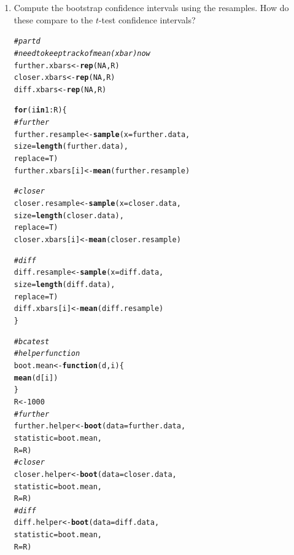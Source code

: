 \documentclass{article}\usepackage[]{graphicx}\usepackage[]{xcolor}
\makeatletter
\newcommand{\hlnum}[1]{\textcolor[rgb]{0.686,0.059,0.569}{#1}}%
\newcommand{\hlcom}[1]{\textcolor[rgb]{0.678,0.584,0.686}{\textit{#1}}}%
\newcommand{\hlopt}[1]{\textcolor[rgb]{0,0,0}{#1}}%
\newcommand{\hldef}[1]{\textcolor[rgb]{0.345,0.345,0.345}{#1}}%
\newcommand{\hlkwa}[1]{\textcolor[rgb]{0.161,0.373,0.58}{\textbf{#1}}}%
\newcommand{\hlkwb}[1]{\textcolor[rgb]{0.69,0.353,0.396}{#1}}%
\newcommand{\hlkwc}[1]{\textcolor[rgb]{0.333,0.667,0.333}{#1}}%
\newcommand{\hlkwd}[1]{\textcolor[rgb]{0.737,0.353,0.396}{\textbf{#1}}}%
\newenvironment{kframe}{%
 \def\at@end@of@kframe{}%
 \ifinner\ifhmode%
  \def\at@end@of@kframe{\end{minipage}}%
  \begin{minipage}{\columnwidth}%
 \fi\fi%
 \def\FrameCommand##1{\hskip\@totalleftmargin \hskip-\fboxsep
 \colorbox{shadecolor}{##1}\hskip-\fboxsep
     \hskip-\linewidth \hskip-\@totalleftmargin \hskip\columnwidth}%
 \MakeFramed {\advance\hsize-\width
   \@totalleftmargin\z@ \linewidth\hsize
   \@setminipage}}%
 {\par\unskip\endMakeFramed%
 \at@end@of@kframe}
\newenvironment{knitrout}{}{} %
\makeatother
\begin{document}
\begin{enumerate}
\begin{enumerate}
  \item Compute the bootstrap confidence intervals using the resamples. How do these 
  compare to the $t$-test confidence intervals? \\
\begin{knitrout}
\color{fgcolor}\begin{kframe}
\begin{alltt}
\hlcom{# part d}
\hlcom{# need to keep track of mean (xbar) now}
\hldef{further.xbars} \hlkwb{<-} \hlkwd{rep}\hldef{(}\hlnum{NA}\hldef{, R)}
\hldef{closer.xbars} \hlkwb{<-} \hlkwd{rep}\hldef{(}\hlnum{NA}\hldef{, R)}
\hldef{diff.xbars} \hlkwb{<-} \hlkwd{rep}\hldef{(}\hlnum{NA}\hldef{, R)}

\hlkwa{for} \hldef{(i} \hlkwa{in} \hlnum{1}\hlopt{:}\hldef{R)\{}
\hlcom{# further}
\hldef{further.resample} \hlkwb{<-} \hlkwd{sample}\hldef{(}\hlkwc{x} \hldef{= further.data,}
                           \hlkwc{size}\hldef{=} \hlkwd{length}\hldef{(further.data),}
                           \hlkwc{replace} \hldef{= T)}
\hldef{further.xbars[i]} \hlkwb{<-} \hlkwd{mean}\hldef{(further.resample)}

\hlcom{# closer}
\hldef{closer.resample} \hlkwb{<-} \hlkwd{sample}\hldef{(}\hlkwc{x} \hldef{= closer.data,}
                          \hlkwc{size}\hldef{=} \hlkwd{length}\hldef{(closer.data),}
                          \hlkwc{replace} \hldef{= T)}
\hldef{closer.xbars[i]} \hlkwb{<-} \hlkwd{mean}\hldef{(closer.resample)}

\hlcom{# diff}
\hldef{diff.resample} \hlkwb{<-} \hlkwd{sample}\hldef{(}\hlkwc{x} \hldef{= diff.data,}
                        \hlkwc{size}\hldef{=} \hlkwd{length}\hldef{(diff.data),}
                        \hlkwc{replace} \hldef{= T)}
\hldef{diff.xbars[i]} \hlkwb{<-} \hlkwd{mean}\hldef{(diff.resample)}
\hldef{\}}

\hlcom{# bca test}
\hlcom{# helper function}
\hldef{boot.mean} \hlkwb{<-} \hlkwa{function}\hldef{(}\hlkwc{d}\hldef{,} \hlkwc{i}\hldef{)\{}
\hlkwd{mean}\hldef{(d[i])}
\hldef{\}}
\hldef{R} \hlkwb{<-} \hlnum{1000}
\hlcom{# further}
\hldef{further.helper} \hlkwb{<-} \hlkwd{boot}\hldef{(}\hlkwc{data} \hldef{= further.data,}
                     \hlkwc{statistic} \hldef{= boot.mean,}
                     \hlkwc{R} \hldef{= R)}
\hlcom{# closer}
\hldef{closer.helper} \hlkwb{<-} \hlkwd{boot}\hldef{(}\hlkwc{data} \hldef{= closer.data,}
                    \hlkwc{statistic} \hldef{= boot.mean,}
                    \hlkwc{R} \hldef{= R)}
\hlcom{# diff}
\hldef{diff.helper} \hlkwb{<-} \hlkwd{boot}\hldef{(}\hlkwc{data} \hldef{= diff.data,}
                  \hlkwc{statistic} \hldef{= boot.mean,}
                  \hlkwc{R} \hldef{= R)}


\end{alltt}
\end{kframe}
\end{knitrout}
\end{enumerate}
\end{enumerate}
\end{document}
